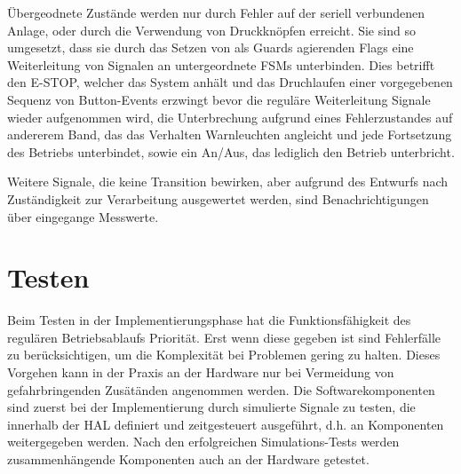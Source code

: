 \documentclass[
   draft=false
  ,paper=a4
  ,twoside=true
  ,fontsize=11pt
  ,headsepline
  ,DIV11
  ,parskip=full+
]{scrartcl} %
\begin{document}
\newline
\newline
Übergeodnete Zustände werden nur durch Fehler auf der seriell verbundenen Anlage, oder durch die Verwendung von Druckknöpfen erreicht. Sie sind so umgesetzt, dass sie durch das Setzen von als Guards agierenden Flags eine Weiterleitung von Signalen an untergeordnete FSMs unterbinden. 
\newline
\newline
Dies betrifft den E-STOP, welcher das System anhält und das Druchlaufen einer vorgegebenen Sequenz von Button-Events erzwingt bevor die reguläre Weiterleitung Signale  wieder aufgenommen wird, die Unterbrechung aufgrund eines Fehlerzustandes auf andererem Band, das das Verhalten Warnleuchten angleicht  und jede Fortsetzung des Betriebs unterbindet, sowie  ein An/Aus, das lediglich den Betrieb unterbricht. 

Weitere Signale, die keine Transition bewirken, aber aufgrund des Entwurfs nach Zuständigkeit zur Verarbeitung ausgewertet werden, sind Benachrichtigungen über eingegange Messwerte. 


\newpage
\section{Testen}
Beim Testen in der Implementierungsphase hat die Funktionsfähigkeit des regulären Betriebsablaufs Priorität. Erst wenn diese gegeben ist sind Fehlerfälle zu berücksichtigen, um die Komplexität bei Problemen gering zu halten. Dieses Vorgehen kann in der Praxis an der Hardware nur bei Vermeidung von gefahrbringenden Zusätänden angenommen werden.
\newline
Die Softwarekomponenten sind zuerst bei der Implementierung durch simulierte Signale zu testen, die innerhalb der HAL definiert und zeitgesteuert ausgeführt, d.h. an Komponenten weitergegeben werden.
\newline
Nach den erfolgreichen Simulations-Tests werden zusammenhängende Komponenten auch an der Hardware getestet.
\end{document}
